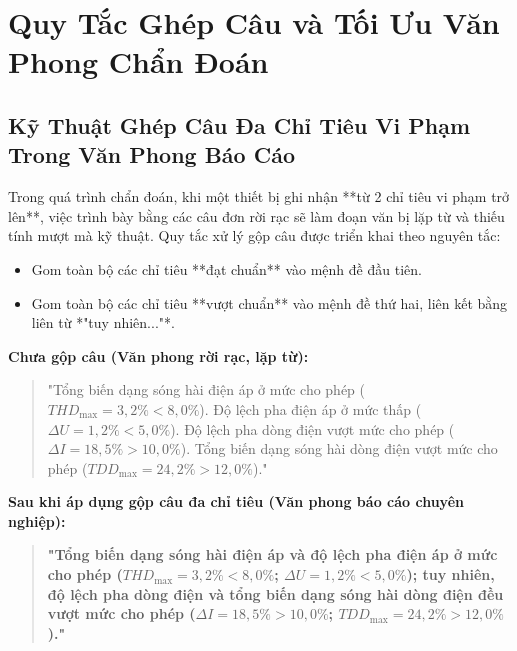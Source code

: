 \documentclass[12pt,a4paper]{article}
\begin{document}
\clearpage
\section{Quy Tắc Ghép Câu và Tối Ưu Văn Phong Chẩn Đoán}

\subsection{Kỹ Thuật Ghép Câu Đa Chỉ Tiêu Vi Phạm Trong Văn Phong Báo Cáo}

Trong quá trình chẩn đoán, khi một thiết bị ghi nhận **từ 2 chỉ tiêu vi phạm trở lên**, việc trình bày bằng các câu đơn rời rạc sẽ làm đoạn văn bị lặp từ và thiếu tính mượt mà kỹ thuật. Quy tắc xử lý gộp câu được triển khai theo nguyên tắc:
\begin{itemize}
  \item Gom toàn bộ các chỉ tiêu **đạt chuẩn** vào mệnh đề đầu tiên.
  \item Gom toàn bộ các chỉ tiêu **vượt chuẩn** vào mệnh đề thứ hai, liên kết bằng liên từ *"tuy nhiên..."*.
\end{itemize}

\begin{warningbox}[title=So Sánh Văn Phong Trước \& Sau Khi Áp Dụng Ghép Câu Đa Chỉ Tiêu]
\textbf{Chưa gộp câu (Văn phong rời rạc, lặp từ):}
\begin{quote}
"Tổng biến dạng sóng hài điện áp ở mức cho phép ($THD_{\max} = 3{,}2\% < 8{,}0\%$). Độ lệch pha điện áp ở mức thấp ($\Delta U = 1{,}2\% < 5{,}0\%$). Độ lệch pha dòng điện vượt mức cho phép ($\Delta I = 18{,}5\% > 10{,}0\%$). Tổng biến dạng sóng hài dòng điện vượt mức cho phép ($TDD_{\max} = 24{,}2\% > 12{,}0\%$)."
\end{quote}

\textbf{Sau khi áp dụng gộp câu đa chỉ tiêu (Văn phong báo cáo chuyên nghiệp):}
\begin{quote}
\textbf{"Tổng biến dạng sóng hài điện áp và độ lệch pha điện áp ở mức cho phép ($THD_{\max} = 3{,}2\% < 8{,}0\%$; $\Delta U = 1{,}2\% < 5{,}0\%$); tuy nhiên, độ lệch pha dòng điện và tổng biến dạng sóng hài dòng điện đều vượt mức cho phép ($\Delta I = 18{,}5\% > 10{,}0\%$; $TDD_{\max} = 24{,}2\% > 12{,}0\%$)."}\end{quote}
\end{warningbox}
\end{document}
